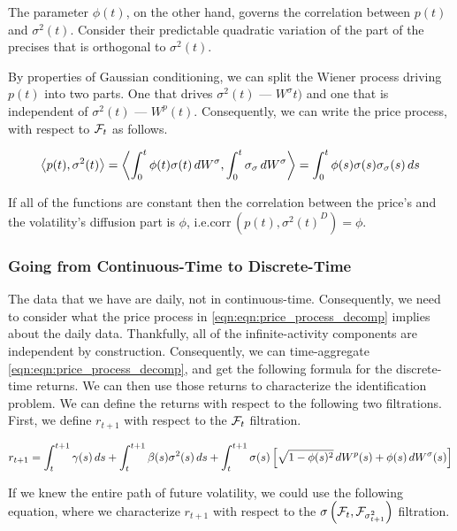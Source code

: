 \documentclass[11pt, letterpaper, twoside, final]{article}
\begin{document}
The parameter $\phi(t)$, on the other hand, governs the correlation between $p(t)$ and $\sigma^2(t)$.
Consider their predictable quadratic variation of the part of the precises that is orthogonal to $\sigma^2(t)$.

By properties of Gaussian conditioning, we can split the Wiener process driving $p(t)$ into two parts.
One that drives $\sigma^2(t)$ --- $W^{\sigma}t)$ and one that is independent of $\sigma^2(t)$ --- $W^p(t)$.
Consequently, we can write the price process, with respect to $\F_t$ as follows.

\begin{equation}
    \predQV*{p(t), \sigma^2(t)}  
    = \predQV*{\int^t_0 \phi(t) \sigma(t) \dif W^{\sigma}, \int^t_0 \sigma_{\sigma} \dif W^{\sigma}} 
    = \int^t_0 \phi(s) \sigma(s) \sigma_{\sigma}(s) \dif s
\end{equation}

If all of the functions are  constant then the correlation between the price's and the volatility's diffusion part
is $\phi$, i.e.\@  $\mathrm{corr}\,(p(t), {\sigma^2(t)}^D) = \phi$.

\subsubsection{Going from Continuous-Time to Discrete-Time}\label{sec:discrete_time_to_cont_time}

The data that we have are daily, not in continuous-time. 
Consequently, we need to consider what the price process in  \cref{eqn:eqn:price_process_decomp} implies about the
daily data.
Thankfully, all of the infinite-activity components are independent by construction.
Consequently, we can time-aggregate \cref{eqn:eqn:price_process_decomp}, and get the following formula for the
discrete-time returns.  
We can then use those returns to characterize the identification problem.
We can define the returns with respect to the following two filtrations.
First, we define $r_{t+1}$ with respect to the $\F_{t}$ filtration.

\begin{equation}
    \label{eqn:discrete_time_rtn}
    r_{t+1} = \int_t^{t+1} \gamma(s) \dif s + \int_{t}^{t+1} \beta(s) \sigma^2(s) \dif s +
    \int_t^{t+1} \sigma(s) \left[\sqrt{1 - \phi(s)^2} \dif W^{p}(s) + \phi(s) \dif W^{\sigma}(s)\right]
\end{equation}

If we knew the entire path of future volatility, we could use the following equation, where we characterize
$r_{t+1}$ with respect to the $\sigma\left(\F_{t}, \F_{\sigma^2_{t+1}}\right)$ filtration.
\end{document}
